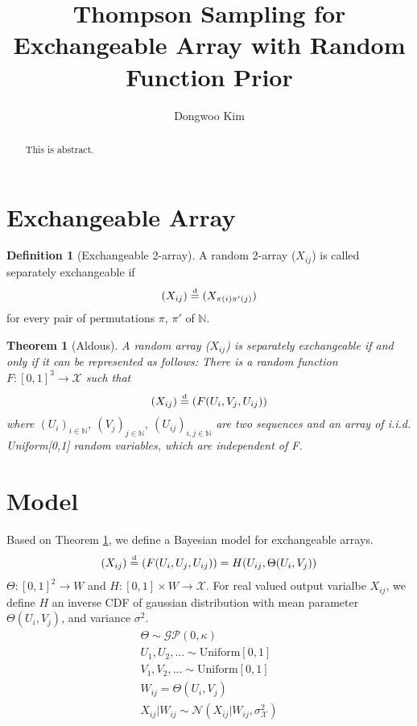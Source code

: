 \documentclass{article} %
\title{Thompson Sampling for Exchangeable Array with Random Function Prior}
\author{
Dongwoo Kim
}
\newtheorem{theorem}{Theorem}[section]
\theoremstyle{definition}
\newtheorem{definition}{Definition}[section]
\newcommand\myeq{\stackrel{\mathclap{\tiny\mbox{d}}}{=}}
\begin{document}
\maketitle

\begin{abstract}
This is abstract.
\end{abstract}

\section{Exchangeable Array}

\begin{definition}[Exchangeable 2-array] A random 2-array ($X_{ij}$) is called separately exchangeable if
\begin{align}
(X_{ij}) \myeq (X_{\pi(i)\pi'(j)})
\end{align}
for every pair of permutations $\pi$, $\pi'$ of $\mathbb{N}$.
\end{definition}

\begin{theorem}[Aldous]\label{thm:exarray} A random array ($X_{ij}$) is separately exchangeable if and only if it can be represented as follows: There is a random function $F:[0,1]^3 \rightarrow \mathcal{X}$ such that
\begin{align}
(X_{ij}) \myeq (F(U_i, V_j, U_{ij}))
\end{align}
where $(U_i)_{i\in\mathbb{N}}$, $(V_j)_{j\in\mathbb{N}}$, $(U_{ij})_{i,j\in\mathbb{N}}$ are two sequences and an array of i.i.d. Uniform[0,1] random variables, which are independent of F.
\end{theorem}

\section{Model}
Based on Theorem \ref{thm:exarray}, we define a Bayesian model for exchangeable arrays.
\begin{align}
(X_{ij}) \myeq (F(U_i, U_j, U_{ij})) = H(U_{ij}, \Theta(U_i, V_j))
\end{align}
$\Theta:[0,1]^2 \rightarrow W$ and $H:[0,1] \times W \rightarrow \mathcal{X}$.
For real valued output varialbe $X_{ij}$, we define $H$ an inverse CDF of gaussian distribution with mean parameter $\Theta(U_i, V_j)$, and variance $\sigma^2$.
\begin{align}
\Theta \sim \mathcal{GP}(0, \kappa)\\
U_1, U_2, ... \sim \text{Uniform}[0,1]\\
V_1, V_2, ... \sim \text{Uniform}[0,1]\\
W_{ij} = \Theta(U_i, V_j) \\
X_{ij} | W_{ij} \sim \mathcal{N}(X_{ij}| W_{ij}, \sigma^2_\mathcal{X})
\end{align}
\end{document}
